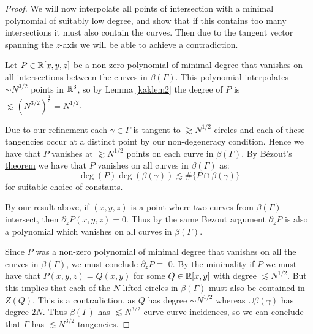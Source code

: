 \begin{proof}
    We will now interpolate all points of intersection with a minimal polynomial of suitably low degree, and show that if this contains too many intersections it must also contain the curves. 
    Then due to the tangent vector spanning the $z$-axis we will be able to achieve a contradiction.

    Let $P \in \mathbb R[x,y,z]$ be a non-zero polynomial of minimal degree that vanishes on all intersections between the curves in $\beta (\Gamma)$. 
    This polynomial interpolates $\sim N^{3/2}$ points in $\mathbb R^3$, so by Lemma \ref{kaklem2} 
    the degree of $P$ is $\lesssim \left(N^{3/2}\right)^{\frac{1}{3}} =  N^{1/2}$. 

    Due to our refinement each $\gamma \in \Gamma$ is 
    tangent to $\gtrsim N^{1/2}$ circles and each of these tangencies occur at a distinct point by our non-degeneracy condition.   
    Hence we have that $P$ vanishes at $\gtrsim N^{1/2}$ points on each curve in $\beta (\Gamma)$.
    By \hyperref[lem:Bezout]{Bézout's theorem} we have that $P$ vanishes on all curves in $\beta(\Gamma)$ as:
    \[
    \deg (P) \deg (\beta(\gamma))  \lesssim \# \{ P \cap \beta(\gamma)\}  
    \]
    for suitable choice of constants. 

    By our result above, if $(x,y,z)$ is a point where two curves from $\beta (\Gamma)$ intersect, then $\partial_z P (x,y,z)  =0 $. 
    Thus by the same Bezout argument $\partial_z P$ is also a polynomial which vanishes on all curves in $\beta(\Gamma)$. 

    Since $P$ was a non-zero polynomial of minimal degree that vanishes on all the curves in $\beta (\Gamma)$, we must conclude 
    $\partial_z P \equiv$ 0. By the minimality if $P$ we must have that $P(x,y,z) = Q(x,y)$ for some $Q \in \mathbb R[x,y]$ with degree $\lesssim N^{1/2}$. 
    But this implies that each of the $N$ lifted circles in $\beta(\Gamma)$ must also be contained in $Z(Q)$.
    This is a contradiction, as $Q$ has degree $\sim N^{1/2}$ whereas $\cup \beta(\gamma)$ has degree $2N$.
    Thus $\beta(\Gamma)$ has $\lesssim N^{3/2}$ curve-curve incidences, so we can conclude that $\Gamma$ has $\lesssim N^{3/2}$ tangencies.
\end{proof}

